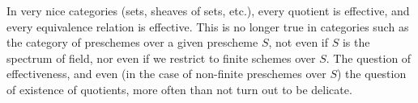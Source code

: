 In very nice categories (sets, sheaves of sets, etc.), every quotient is effective, and every equivalence relation is effective.
This is no longer true in categories such as the category of preschemes over a given prescheme $S$, not even if $S$ is the spectrum of field, nor even if we restrict to finite schemes over $S$.
The question of effectiveness, and even (in the case of non-finite preschemes over $S$) the question of existence of quotients, more often than not turn out to be delicate.
